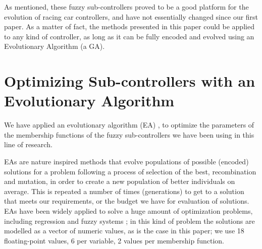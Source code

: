 \documentclass[10pt,journal,compsoc]{IEEEtran}
\begin{document}
As mentioned, these fuzzy sub-controllers proved to be a good platform for the evolution of racing car controllers, and have not essentially changed since our first paper. As a matter of fact, the methods presented in this paper could
be applied to any kind of controller, as long as it can be fully
encoded and evolved using an Evolutionary Algorithm (a GA). 




\section{Optimizing Sub-controllers with an Evolutionary Algorithm}
\label{sec:ga}

We have applied an evolutionary algorithm (EA) \cite{EAs_Back96}, to optimize the parameters of the membership functions of the fuzzy sub-controllers we have been using in this line of research.

EAs are nature inspired methods that evolve populations of possible (encoded) solutions for a problem following a process of selection of the best,
recombination and mutation, in order to create a new population of
better individuals on average. This is repeated a number of times
(generations) to get to a solution that meets our requirements, or the
budget we have for evaluation of solutions. EAs have been widely
applied to solve a huge amount of optimization problems, including regression and fuzzy systems \cite{hoffmann2001evolutionary}; in this kind of problem the solutions are modelled as a vector of numeric values, as is the
case in this paper; we use 18 floating-point values, 6 per variable, 2 values per membership function.


\end{document}
